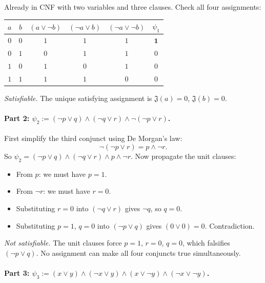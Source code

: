\documentclass{article}
\theoremstyle{theorem}
\theoremstyle{definition}
\theoremstyle{remark}
\begin{document}
Already in CNF with two variables and three clauses. Check all four assignments:

\begin{center}
\begin{tabular}{cc|ccc|c}
$a$ & $b$ & $(a \lor \lnot b)$ & $(\lnot a \lor b)$ & $(\lnot a \lor \lnot b)$ & $\psi_1$ \\ \hline
$0$ & $0$ & $1$ & $1$ & $1$ & $\mathbf{1}$ \\
$0$ & $1$ & $0$ & $1$ & $1$ & $0$ \\
$1$ & $0$ & $1$ & $0$ & $1$ & $0$ \\
$1$ & $1$ & $1$ & $1$ & $0$ & $0$ \\
\end{tabular}
\end{center}

\emph{Satisfiable.} The unique satisfying assignment is $\mathfrak{J}(a) = 0$, $\mathfrak{J}(b) = 0$.

\paragraph{Part 2: $\psi_2 := (\lnot p \lor q) \land (\lnot q \lor r) \land \lnot(\lnot p \lor r)$.}

First simplify the third conjunct using De Morgan's law:
\[
  \lnot(\lnot p \lor r) = p \land \lnot r.
\]
So $\psi_2 = (\lnot p \lor q) \land (\lnot q \lor r) \land p \land \lnot r$. Now propagate the unit clauses:
\begin{itemize}
  \item From $p$: we must have $p = 1$.
  \item From $\lnot r$: we must have $r = 0$.
  \item Substituting $r = 0$ into $(\lnot q \lor r)$ gives $\lnot q$, so $q = 0$.
  \item Substituting $p = 1$, $q = 0$ into $(\lnot p \lor q)$ gives $(0 \lor 0) = 0$. Contradiction.
\end{itemize}

\emph{Not satisfiable.} The unit clauses force $p = 1$, $r = 0$, $q = 0$, which falsifies $(\lnot p \lor q)$. No assignment can make all four conjuncts true simultaneously.

\paragraph{Part 3: $\psi_3 := (x \lor y) \land (\lnot x \lor y) \land (x \lor \lnot y) \land (\lnot x \lor \lnot y)$.}
\end{document}
